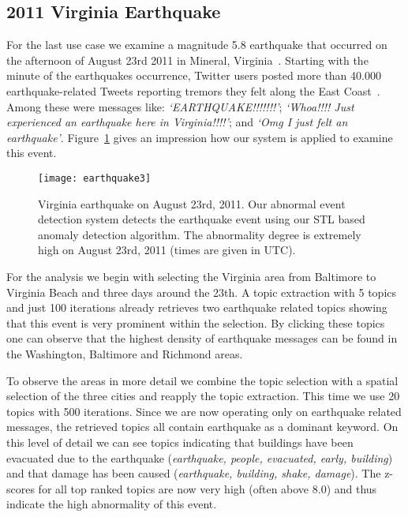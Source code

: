 \subsection{2011 Virginia Earthquake}
\label{subsec:virginia_earthquake}
For the last use case we examine a magnitude 5.8 earthquake that occurred on the afternoon of August 23rd 2011 in Mineral, Virginia~\cite{USGS:2011:M5V}.
Starting with the minute of the earthquakes occurrence, Twitter users posted more than 40.000 earthquake-related Tweets reporting tremors they felt along the East Coast~\cite{Indvik:2011:ECT}.
Among these were messages like:
\textit{\textquoteleft EARTHQUAKE!!!!!!!\textquoteright}; \textit{\textquoteleft Whoa!!!! Just experienced an earthquake here in Virginia!!!!\textquoteright}; and 
\textit{\textquoteleft Omg I just felt an earthquake\textquoteright}.
Figure~\ref{fig:earthquake} gives an impression how our system is applied to examine this event.

\begin{figure}[htb]
	\centering
	\texttt{[image: earthquake3]}
	\caption{Virginia earthquake on August 23rd, 2011. Our abnormal event detection system detects the earthquake event
	using our STL based anomaly detection algorithm. The abnormality degree is extremely high
	on August 23rd, 2011 (times are given in UTC).}
	\label{fig:earthquake}
\end{figure}

For the analysis we begin with selecting the Virginia area from Baltimore to Virginia Beach and three days around the 23th. A topic extraction with 5 topics and just 100 iterations already retrieves two earthquake related topics showing that this event is very prominent within the selection. By clicking these topics one can observe that the highest density of earthquake messages can be found in the Washington, Baltimore and Richmond areas. 

To observe the areas in more detail we combine the topic selection with a spatial selection of the three cities and reapply the topic extraction. This time we use 20 topics with 500 iterations. Since we are now operating only on earthquake related messages, the retrieved topics all contain earthquake as a dominant keyword. On this level of detail we can see topics indicating that buildings have been evacuated due to the earthquake (\textit{earthquake, people, evacuated, early, building}) and that damage has been caused (\textit{earthquake, building, shake, damage}). The z-scores for all top ranked topics are now very high (often above 8.0) and thus indicate the high abnormality of this event. 

